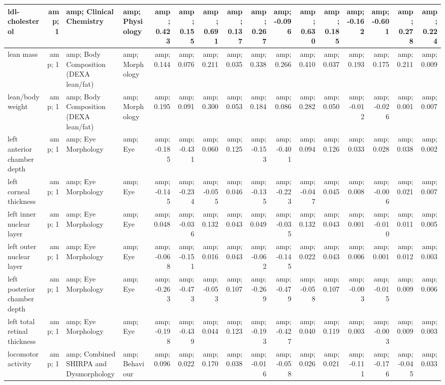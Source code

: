\documentclass[]{article}
\begin{document}
\begin{table}
\begin{tabular}[t]{l|r|l|l|r|r|r|r|r|r|r|r|r|r|r|r}
\hline
ldl-cholesterol &amp; 1 &amp; Clinical Chemistry &amp; Physiology &amp; 0.423 &amp; 0.155 &amp; 0.691 &amp; 0.137 &amp; 0.267 &amp; -0.096 &amp; 0.630 &amp; 0.185 &amp; -0.162 &amp; -0.601 &amp; 0.278 &amp; 0.224\\
\hline
lean mass &amp; 1 &amp; Body Composition (DEXA lean/fat) &amp; Morphology &amp; 0.144 &amp; 0.076 &amp; 0.211 &amp; 0.035 &amp; 0.338 &amp; 0.266 &amp; 0.410 &amp; 0.037 &amp; 0.193 &amp; 0.175 &amp; 0.211 &amp; 0.009\\
\hline
lean/body weight &amp; 1 &amp; Body Composition (DEXA lean/fat) &amp; Morphology &amp; 0.195 &amp; 0.091 &amp; 0.300 &amp; 0.053 &amp; 0.184 &amp; 0.086 &amp; 0.282 &amp; 0.050 &amp; -0.012 &amp; -0.026 &amp; 0.001 &amp; 0.007\\
\hline
left anterior chamber depth &amp; 1 &amp; Eye Morphology &amp; Eye &amp; -0.185 &amp; -0.431 &amp; 0.060 &amp; 0.125 &amp; -0.153 &amp; -0.401 &amp; 0.094 &amp; 0.126 &amp; 0.033 &amp; 0.028 &amp; 0.038 &amp; 0.002\\
\hline
left corneal thickness &amp; 1 &amp; Eye Morphology &amp; Eye &amp; -0.145 &amp; -0.234 &amp; -0.055 &amp; 0.046 &amp; -0.135 &amp; -0.223 &amp; -0.047 &amp; 0.045 &amp; 0.008 &amp; -0.006 &amp; 0.021 &amp; 0.007\\
\hline
left inner nuclear layer &amp; 1 &amp; Eye Morphology &amp; Eye &amp; 0.048 &amp; -0.036 &amp; 0.132 &amp; 0.043 &amp; 0.049 &amp; -0.035 &amp; 0.132 &amp; 0.043 &amp; 0.001 &amp; -0.010 &amp; 0.011 &amp; 0.005\\
\hline
left outer nuclear layer &amp; 1 &amp; Eye Morphology &amp; Eye &amp; -0.068 &amp; -0.151 &amp; 0.016 &amp; 0.043 &amp; -0.062 &amp; -0.145 &amp; 0.022 &amp; 0.043 &amp; 0.006 &amp; 0.001 &amp; 0.012 &amp; 0.003\\
\hline
left posterior chamber depth &amp; 1 &amp; Eye Morphology &amp; Eye &amp; -0.263 &amp; -0.473 &amp; -0.053 &amp; 0.107 &amp; -0.269 &amp; -0.479 &amp; -0.058 &amp; 0.107 &amp; -0.003 &amp; -0.015 &amp; 0.009 &amp; 0.006\\
\hline
left total retinal thickness &amp; 1 &amp; Eye Morphology &amp; Eye &amp; -0.198 &amp; -0.439 &amp; 0.044 &amp; 0.123 &amp; -0.193 &amp; -0.427 &amp; 0.040 &amp; 0.119 &amp; 0.003 &amp; -0.003 &amp; 0.009 &amp; 0.003\\
\hline
locomotor activity &amp; 1 &amp; Combined SHIRPA and Dysmorphology &amp; Behaviour &amp; 0.096 &amp; 0.022 &amp; 0.170 &amp; 0.038 &amp; -0.016 &amp; -0.058 &amp; 0.026 &amp; 0.021 &amp; -0.111 &amp; -0.176 &amp; -0.045 &amp; 0.033\\

\end{tabular}
\end{table}
\end{document}
